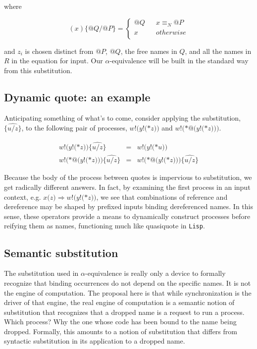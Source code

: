 \documentclass[]{amsart}
\makeatletter
\newcommand{\nameeq}{\mathbin{\equiv_N}}
\newcommand{\quotep}[1]{@#1}
\theoremstyle{definition}
\theoremstyle{remark}
\numberwithin{equation}{subsection}
\makeatother
\begin{document}
where

\begin{equation*}
(x){\{} {@}Q / {@}P {\}}            = 
		\left\{ 
			\begin{array}{ccc}
				{@}Q & & x \nameeq {@}P \\
                                x & & otherwise \\
			\end{array}
		\right.
\end{equation*}

and $z_i$ is chosen distinct from $\quotep{P}$, $\quotep{Q}$, the free
names in $Q$, and all the names in $R$ in the equation for input. Our
$\alpha$-equivalence will be built in the standard way from this
substitution.

\subsection{ Dynamic quote: an example }

Anticipating something of what's to come, consider applying the
substitution, $\widehat{{\{}u / z {\}}}$, to the following pair
of processes, ${w}{!}{(}{y}{!}{(}{*}{z}{)}{)}$ and ${w}{!}{(}{*}{@}({y}{!}{(}{*z}{)}{)}{)}$.

\begin{eqnarray*}
	{w}{!}{(}{y}{!}{(}{*}{z}{)}{)}\widehat{{\{}u / z{\}}}
		& = &
		{w}{!}{(}{y}{!}{(}{*}u{)}{)} \\
        {w}{!}{(}{*}{@}({y}{!}{(}{*z}{)}{)}{)}\widehat{{\{}u / z{\}} }
		& = &
		{w}{!}{(}{*}{@}({y}{!}{(}{*z}{)}{)}{)}\widehat{{\{}u / z{\}} }
\end{eqnarray*}

Because the body of the process between quotes is impervious to
substitution, we get radically different answers. In fact, by
examining the first process in an input context, e.g. $x{(}{z}{)}
\Rightarrow {w}{!}{(}{y}{!}{(}{*}{z}{)}{)}$, we see that combinations
of reference and dereference may be shaped by prefixed inputs binding
dereferenced names. In this sense, these operators provide a means to
dynamically construct processes before reifying them as names,
functioning much like quasiquote in \texttt{Lisp}.

\subsection{Semantic substitution}

The substitution used in $\alpha$-equivalence is really only a device
to formally recognize that binding occurrences do not depend on the
specific names. It is not the engine of computation. The proposal here
is that while synchronization is the driver of that engine, the real
engine of computation is a semantic notion of substitution that
recognizes that a dropped name is a request to run a process. Which
process? Why the one whose code has been bound to the name being
dropped. Formally, this amounts to a notion of substitution that
differs from syntactic substitution in its application to a dropped
name.
\end{document}
